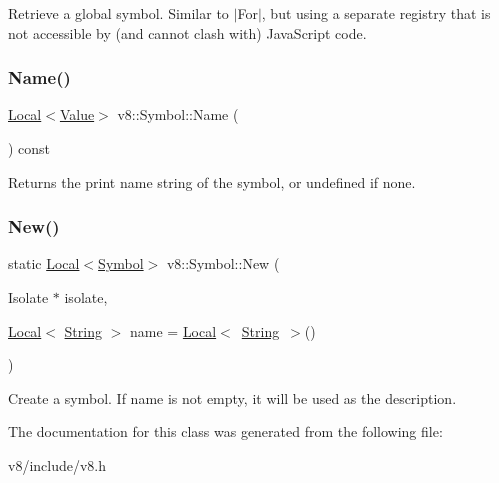 Retrieve a global symbol. Similar to $\vert$\+For$\vert$, but using a separate registry that is not accessible by (and cannot clash with) Java\+Script code. \mbox{\label{classv8_1_1Symbol_a8ed6ef9221bc26fbe978bfc5e33f31b4}} 
\subsubsection{\texorpdfstring{Name()}{Name()}}
{\footnotesize\ttfamily \mbox{\hyperlink{classv8_1_1Local}{Local}}$<$\mbox{\hyperlink{classv8_1_1Value}{Value}}$>$ v8\+::\+Symbol\+::\+Name (\begin{DoxyParamCaption}{ }\end{DoxyParamCaption}) const}

Returns the print name string of the symbol, or undefined if none. \mbox{\label{classv8_1_1Symbol_add1f6084974464105b56595d34c14ab9}} 
\subsubsection{\texorpdfstring{New()}{New()}}
{\footnotesize\ttfamily static \mbox{\hyperlink{classv8_1_1Local}{Local}}$<$\mbox{\hyperlink{classv8_1_1Symbol}{Symbol}}$>$ v8\+::\+Symbol\+::\+New (\begin{DoxyParamCaption}\item[{Isolate $\ast$}]{isolate,  }\item[{\mbox{\hyperlink{classv8_1_1Local}{Local}}$<$ \mbox{\hyperlink{classv8_1_1String}{String}} $>$}]{name = {\ttfamily \mbox{\hyperlink{classv8_1_1Local}{Local}}$<$~\mbox{\hyperlink{classv8_1_1String}{String}}~$>$()} }\end{DoxyParamCaption})\hspace{0.3cm}{\ttfamily [static]}}

Create a symbol. If name is not empty, it will be used as the description. 

The documentation for this class was generated from the following file\+:\begin{DoxyCompactItemize}
\item 
v8/include/v8.\+h\end{DoxyCompactItemize}
